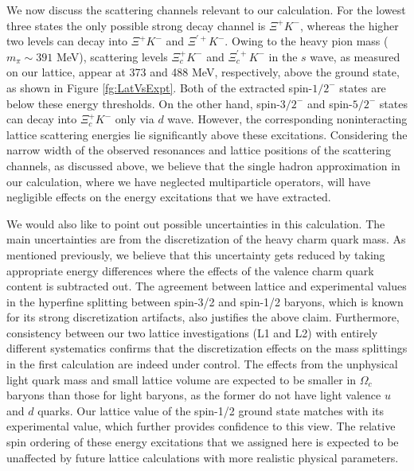 \documentclass[showkeys,aps,twocolumn,showpacs,preprintnumbers,amsmath,amssymb,prd,letterpaper,floatfix,nofootinbib,superscriptaddress,]{revtex4-1}
\newcommand\fgn[1]{Figure \ref{fg:#1}}
\begin{document}
{We now discuss the scattering channels relevant to our
calculation.  For the lowest three states the only
possible strong decay channel is $\Xi^+K^-$, whereas the higher two
levels can decay into $\Xi^+K^-$ and $\Xi^{\prime +}K^-$.  Owing to the
heavy pion mass ($m_{\pi}\sim391$ MeV),  
scattering levels $\Xi_c^+K^-$ and $\Xi_c^{\prime +}K^-$
in the $s$ wave, as measured on our lattice, appear at 373 and 488 MeV, 
respectively, above the ground state, as shown in \fgn{LatVsExpt}. Both
of the extracted spin-$1/2^{-}$ states are below these energy
thresholds. On the other hand, spin-$3/2^{-}$ and spin-$5/2^{-}$ states
can decay into $\Xi_c^+K^-$ only via $d$ wave.  However, the
corresponding noninteracting lattice scattering energies lie
significantly above these excitations.  
Considering the narrow width of the observed resonances \cite{Aaij:2017nav}
and lattice positions of the scattering channels, as discussed above,  
we  believe that the
single hadron approximation in our calculation, where we have
neglected multiparticle operators, will have negligible effects on
the energy excitations that we have extracted.


We would also like to point out possible uncertainties in this
calculation. The main uncertainties are from the discretization of the heavy
charm quark mass. As mentioned previously, we believe that this
uncertainty gets reduced by taking appropriate energy differences
 where the effects of the valence charm quark
content is subtracted out.  The agreement between lattice and
experimental values in the hyperfine splitting between spin-3/2 and
spin-1/2 baryons, which is known for its strong discretization
artifacts, also justifies the above claim. 
Furthermore, consistency between our two lattice investigations (L1 and L2) with entirely different systematics confirms that the discretization effects on the mass splittings in the first calculation are indeed under control. 
The effects from the unphysical light quark mass and small lattice volume 
are expected to be smaller in $\Omega_c$ baryons than those for light baryons, as the former do not have light valence $u$ and $d$ quarks. Our lattice value of the spin-1/2 ground
state matches with its experimental value, which further provides
confidence to this view. The relative spin ordering of these energy
excitations that we assigned here is expected to be unaffected by 
future lattice calculations with more realistic physical parameters.



}
\end{document}
